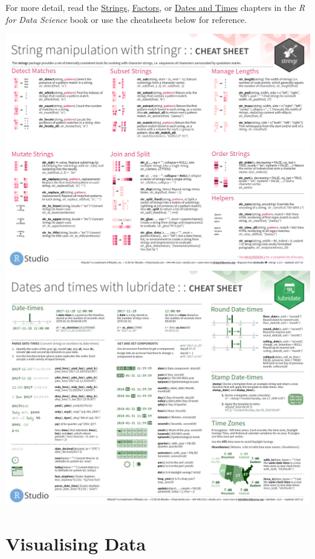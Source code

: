 \documentclass[]{book}
\begin{document}
For more detail, read the \href{https://r4ds.had.co.nz/strings.html}{Strings},
\href{https://r4ds.had.co.nz/factors.html}{Factors}, or
\href{https://r4ds.had.co.nz/dates-and-times.html}{Dates and Times} chapters in the
\emph{R for Data Science} book or use the cheatsheets below for reference.

\href{https://github.com/rstudio/cheatsheets/raw/master/strings.pdf}{\includegraphics{images/stringr.png}}
\href{https://github.com/rstudio/cheatsheets/raw/master/lubridate.pdf}{\includegraphics{images/lubridate.png}}

\hypertarget{visualising-data}{%
\section{Visualising Data}\label{visualising-data}}
\end{document}
